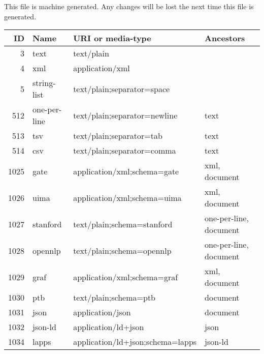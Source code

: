 This file is machine generated. Any changes will be lost the next time this file is generated.
\begin{longtable}{| r | l | l | p{3cm} | }
\hline \multicolumn{1}{|r|}{\textbf{ID}} & \multicolumn{1}{l|}{\textbf{Name}} & \multicolumn{1}{l|}{\textbf{URI or media-type}} & \multicolumn{1}{l|}{\textbf{Ancestors}} \\ \hline
\endhead

3 & text & text/plain &  \\ \hline
4 & xml & application/xml &  \\ \hline
5 & string-list & text/plain;separator=space &  \\ \hline
512 & one-per-line & text/plain;separator=newline & text \\ \hline
513 & tsv & text/plain;separator=tab & text \\ \hline
514 & csv & text/plain;separator=comma & text \\ \hline
1025 & gate & application/xml;schema=gate & xml, document \\ \hline
1026 & uima & application/xml;schema=uima & xml, document \\ \hline
1027 & stanford & text/plain;schema=stanford & one-per-line, document \\ \hline
1028 & opennlp & text/plain;schema=opennlp & one-per-line, document \\ \hline
1029 & graf & application/xml;schema=graf & xml, document \\ \hline
1030 & ptb & text/plain;schema=ptb & document \\ \hline
1031 & json & application/json & document \\ \hline
1032 & json-ld & application/ld+json & json \\ \hline
1034 & lapps & application/ld+json;schema=lapps & json-ld \\ \hline
\end{longtable}
